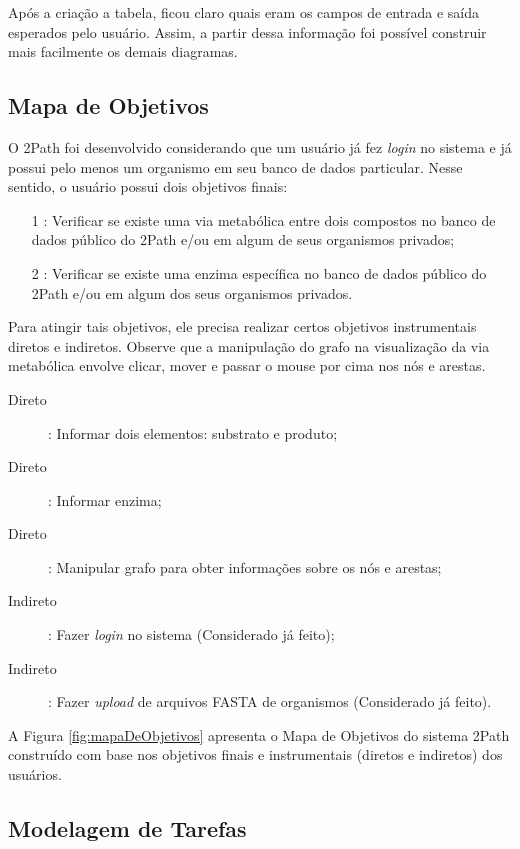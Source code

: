 \indent Após a criação a tabela, ficou claro quais eram os campos de entrada e saída esperados pelo usuário. Assim, a partir dessa informação foi possível construir mais facilmente os demais diagramas.

\subsection{Mapa de Objetivos}

\indent O 2Path foi desenvolvido considerando que um usuário já fez \textit{login} no sistema e já possui pelo menos um organismo em seu banco de dados particular. Nesse sentido, o usuário possui dois objetivos finais:
\begin{itemize}
\item[1]: Verificar se existe uma via metabólica entre dois compostos no banco de dados público do 2Path e/ou em algum de seus organismos privados;
\item[2]: Verificar se existe uma enzima específica no banco de dados público do 2Path e/ou em algum dos seus organismos privados. 
\end{itemize}

\indent Para atingir tais objetivos, ele precisa realizar certos objetivos instrumentais diretos e indiretos. Observe que a manipulação do grafo na visualização da via metabólica envolve clicar, mover e passar o mouse por cima nos nós e arestas.
\begin{description}
\item[Direto]: Informar dois elementos: substrato e produto;
\item[Direto]: Informar enzima;
\item[Direto]: Manipular grafo para obter informações sobre os nós e arestas;
\item[Indireto]: Fazer \textit{login} no sistema (Considerado já feito);
\item[Indireto]: Fazer \textit{upload} de arquivos FASTA de organismos (Considerado já feito).
\end{description}

\indent A Figura \ref{fig:mapaDeObjetivos} apresenta o Mapa de Objetivos do sistema 2Path construído com base nos objetivos finais e instrumentais (diretos e indiretos) dos usuários. 

\subsection{Modelagem de Tarefas}

